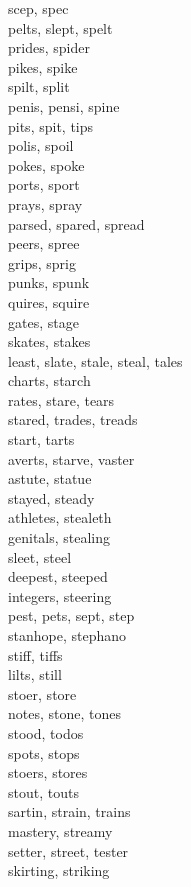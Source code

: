 scep, spec\\
pelts, slept, spelt\\
prides, spider\\
pikes, spike\\
spilt, split\\
penis, pensi, spine\\
pits, spit, tips\\
polis, spoil\\
pokes, spoke\\
ports, sport\\
prays, spray\\
parsed, spared, spread\\
peers, spree\\
grips, sprig\\
punks, spunk\\
quires, squire\\
gates, stage\\
skates, stakes\\
least, slate, stale, steal, tales\\
charts, starch\\
rates, stare, tears\\
stared, trades, treads\\
start, tarts\\
averts, starve, vaster\\
astute, statue\\
stayed, steady\\
athletes, stealeth\\
genitals, stealing\\
sleet, steel\\
deepest, steeped\\
integers, steering\\
pest, pets, sept, step\\
stanhope, stephano\\
stiff, tiffs\\
lilts, still\\
stoer, store\\
notes, stone, tones\\
stood, todos\\
spots, stops\\
stoers, stores\\
stout, touts\\
sartin, strain, trains\\
mastery, streamy\\
setter, street, tester\\
skirting, striking\\
